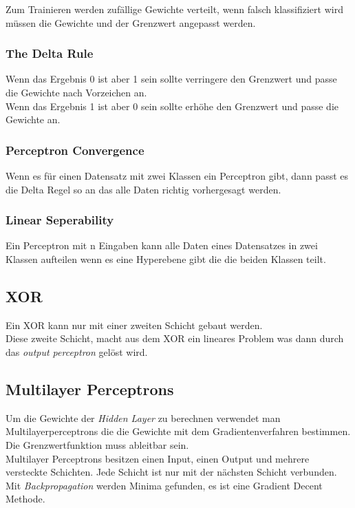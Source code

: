 \documentclass[a4paper]{scrartcl}
\begin{document}
Zum Trainieren werden zufällige Gewichte verteilt, wenn falsch klassifiziert wird müssen die Gewichte und der Grenzwert angepasst werden.

\subsubsection{The Delta Rule}
Wenn das Ergebnis 0 ist aber 1 sein sollte verringere den Grenzwert und passe die Gewichte nach Vorzeichen an.\\
Wenn das Ergebnis 1 ist aber 0 sein sollte erhöhe den Grenzwert und passe die Gewichte an.\\

\subsubsection{Perceptron Convergence}
Wenn es für einen Datensatz mit zwei Klassen ein Perceptron gibt, dann passt es die Delta Regel so an das alle Daten richtig vorhergesagt werden.

\subsubsection{Linear Seperability}
Ein Perceptron mit n Eingaben kann alle Daten eines Datensatzes in zwei Klassen aufteilen wenn es eine Hyperebene gibt die die beiden Klassen teilt.

\subsection{XOR}
Ein XOR kann nur mit einer zweiten Schicht gebaut werden.\\
Diese zweite Schicht, macht aus dem XOR ein lineares Problem was dann durch das \textit{output perceptron} gelöst wird.

\subsection{Multilayer Perceptrons}
Um die Gewichte der \textit{Hidden Layer} zu berechnen verwendet man Multilayerperceptrons die die Gewichte mit dem Gradientenverfahren bestimmen. Die Grenzwertfunktion muss ableitbar sein.\\
Multilayer Perceptrons besitzen einen Input, einen Output und mehrere versteckte Schichten. Jede Schicht ist nur mit der nächsten Schicht verbunden.\\
Mit \textit{Backpropagation} werden Minima gefunden, es ist eine Gradient Decent Methode.\\
\end{document}

